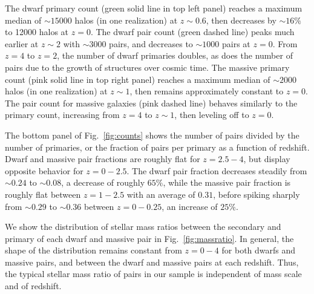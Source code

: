 \documentclass[twocolumn]{aastex631}
\begin{document}
    The dwarf primary count (green solid line in top left panel) reaches a maximum median of $\sim15000$ halos (in one realization) at $z\sim0.6$, then decreases by $\sim16\%$ to 12000 halos at $z=0$. 
    The dwarf pair count (green dashed line) peaks much earlier at $z\sim2$ with $\sim3000$ pairs, and decreases to $\sim1000$ pairs at $z=0$.
    From $z=4$ to $z=2$, the number of dwarf primaries doubles, as does the number of pairs due to the growth of structures over cosmic time.
    The massive primary count (pink solid line in top right panel) reaches a maximum median of $\sim2000$ halos (in one realization) at $z\sim1$, then remains approximately constant to $z=0$. 
    The pair count for massive galaxies (pink dashed line) behaves similarly to the primary count, increasing from $z=4$ to $z\sim1$, then leveling off to $z=0$. 

    

    The bottom panel of Fig.~\ref{fig:counts} shows the number of pairs divided by the number of primaries, or the fraction of pairs per primary as a function of redshift. 
    Dwarf and massive pair fractions are roughly flat for $z=2.5-4$, but display opposite behavior for $z=0-2.5$. The dwarf pair fraction decreases steadily from $\sim0.24$ to $\sim0.08$, a decrease of roughly $65\%$, while the massive pair fraction is roughly flat between $z=1-2.5$ with an average of $0.31$, before spiking sharply from $\sim 0.29$ to $\sim 0.36$ between $z=0-0.25$, an increase of $25\%$.

    We show the distribution of stellar mass ratios between the secondary and primary of each dwarf and massive pair in Fig.~\ref{fig:massratio}.
    In general, the shape of the distribution remains constant from $z=0-4$ for both dwarfs and massive pairs, and between the dwarf and massive pairs at each redshift. 
    Thus, the typical stellar mass ratio of pairs in our sample is independent of mass scale and of redshift.
            


  
\end{document}

